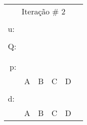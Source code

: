 \documentclass[16pt]{examdesign}
\begin{document}
\begin{fillin}[title={},
                    rearrange=no,resetcounter=no,suppressprefix]
\begin{question}
\begin{multicols}{4}
\begin{tabular}{|llllll|}
  \end{tabular}
  \begin{tabular}{|llllll|}
  \hline
  \multicolumn{6}{|c|}{Iteração \# 2}                                                                                                          \\
					    &                       &                       &                       &                       &  \\
  u:                                        &                       &                       &                       &                       &  \\ \cline{2-3}
					    &                       &                       &                       &                       &  \\ \cline{2-5}
  \multicolumn{1}{|r|}{Q:}                  & \multicolumn{1}{l|}{} & \multicolumn{1}{l|}{} & \multicolumn{1}{l|}{} & \multicolumn{1}{l|}{} &  \\
  \multicolumn{1}{|l|}{}                    & \multicolumn{1}{l|}{} & \multicolumn{1}{l|}{} & \multicolumn{1}{l|}{} & \multicolumn{1}{l|}{} &  \\ \cline{2-5}
					    &                       &                       &                       &                       &  \\ \cline{2-5}
  \multicolumn{1}{|r|}{\multirow{2}{*}{p:}} & \multicolumn{1}{l|}{} & \multicolumn{1}{l|}{} & \multicolumn{1}{l|}{} & \multicolumn{1}{l|}{} &  \\
  \multicolumn{1}{|r|}{}                    & \multicolumn{1}{l|}{} & \multicolumn{1}{l|}{} & \multicolumn{1}{l|}{} & \multicolumn{1}{l|}{} &  \\ \cline{2-5}
					    & A                     & B                     & C                     & D                     &  \\
					    &                       &                       &                       &                       &  \\ \cline{2-5}
  \multicolumn{1}{|l|}{\multirow{2}{*}{d:}} & \multicolumn{1}{l|}{} & \multicolumn{1}{l|}{} & \multicolumn{1}{l|}{} & \multicolumn{1}{l|}{} &  \\
  \multicolumn{1}{|l|}{}                    & \multicolumn{1}{l|}{} & \multicolumn{1}{l|}{} & \multicolumn{1}{l|}{} & \multicolumn{1}{l|}{} &  \\ \cline{2-5}
					    & A                     & B                     & C                     & D                     &  \\ \hline

\end{tabular}
\end{multicols}
\end{question}
\end{fillin}
\end{document}
